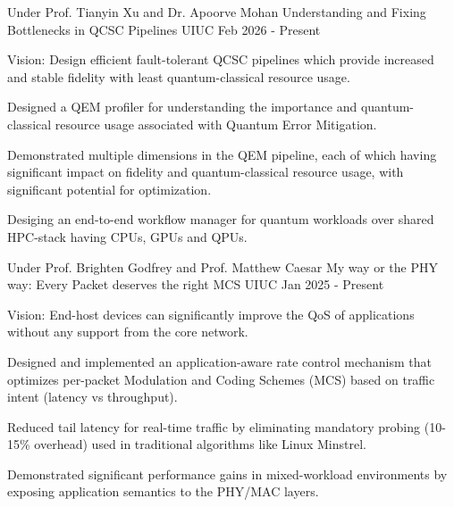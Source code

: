 

\begin{cventries}

  \cventry
    {Under Prof. Tianyin Xu and Dr. Apoorve Mohan} %
    {Understanding and Fixing Bottlenecks in QCSC Pipelines} %
    {UIUC} %
    {Feb 2026 - Present} %
    {
      \begin{cvitems} %
        \item Vision: Design efficient fault-tolerant QCSC pipelines which provide increased and stable fidelity with least quantum-classical resource usage.
        \item Designed a QEM profiler for understanding the importance and quantum-classical resource usage associated with Quantum Error Mitigation.
        \item Demonstrated multiple dimensions in the QEM pipeline, each of which having significant impact on fidelity and quantum-classical resource usage, with significant potential for optimization.
        \item Desiging an end-to-end workflow manager for quantum workloads over shared HPC-stack having CPUs, GPUs and QPUs.
      \end{cvitems}
    }


  \cventry
    {Under Prof. Brighten Godfrey and Prof. Matthew Caesar} %
    {My way or the PHY way: Every Packet deserves the right MCS} %
    {UIUC} %
    {Jan 2025 - Present} %
    {
      \begin{cvitems} %
        \item Vision: End-host devices can significantly improve the QoS of applications without any support from the core network.
        \item Designed and implemented an application-aware rate control mechanism that optimizes per-packet Modulation and Coding Schemes (MCS) based on traffic intent (latency vs throughput).
        \item Reduced tail latency for real-time traffic by eliminating mandatory probing (10-15\% overhead) used in traditional algorithms like Linux Minstrel.
        \item Demonstrated significant performance gains in mixed-workload environments by exposing application semantics to the PHY/MAC layers.
      \end{cvitems}
    }


\end{cventries}
